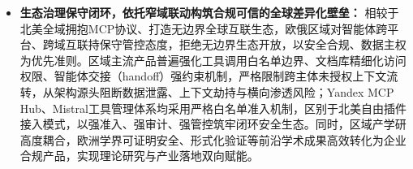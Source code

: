 \begin{itemize}[tabitem]
    \item \textbf{生态治理保守闭环，依托窄域联动构筑合规可信的全球差异化壁垒：}
    相较于北美全域拥抱MCP协议、打造无边界全球互联生态，欧俄区域对智能体跨平台、跨域互联持保守管控态度，拒绝无边界生态开放，以安全合规、数据主权为优先准则\cite{mistralagentsapi2025,yandexaistudio2026}。区域主流产品普遍强化工具调用白名单边界、文档库精细化访问权限、智能体交接（handoff）强约束机制，严格限制跨主体未授权上下文流转，从架构源头阻断数据泄露、上下文劫持与横向渗透风险\cite{mistralforge2026,yandexaistudiosecurity2026}；Yandex MCP Hub、Mistral工具管理体系均采用严格白名单准入机制，区别于北美自由插件接入模式，以强准入、强审计、强管控筑牢闭环安全生态\cite{yandexaistudio2026,mistralstudio2026}。同时，区域产学研高度耦合，欧洲学界可证明安全、形式化验证等前沿学术成果高效转化为企业合规产品，实现理论研究与产业落地双向赋能\cite{alephphariaaipdf2025}。
\end{itemize}


\begingroup
\enlargethispage{1cm}
\footnotesize
\centering



